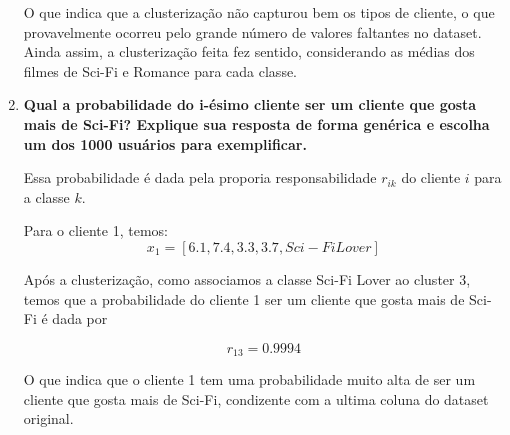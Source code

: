 \begin{enumerate}
\begin{tcolorbox}[title=Resposta:]
        O que indica que a clusterização não capturou bem os tipos de cliente, o que provavelmente ocorreu pelo grande número de valores faltantes no dataset. Ainda assim, a clusterização feita fez sentido, considerando as médias dos filmes de Sci-Fi e Romance para cada classe.

    \end{tcolorbox}
    \newpage
    \item \textbf{Qual a probabilidade do i-ésimo cliente ser um cliente que gosta mais de Sci-Fi? Explique sua resposta de forma genérica e escolha um dos 1000 usuários para exemplificar.}
    \begin{tcolorbox}[title=Resposta:]
        Essa probabilidade é dada pela proporia responsabilidade $r_{ik}$ do cliente $i$ para a classe $k$.

        Para o cliente 1, temos:
        $$ x_1 = [6.1, 7.4, 3.3, 3.7, Sci-Fi Lover] $$

        Após a clusterização, como associamos a classe Sci-Fi Lover ao cluster 3, temos que a probabilidade do cliente 1 ser um cliente que gosta mais de Sci-Fi é dada por

        $$ r_{13} = 0.9994$$

        O que indica que o cliente 1 tem uma probabilidade muito alta de ser um cliente que gosta mais de Sci-Fi, condizente com a ultima coluna do dataset original.
    \end{tcolorbox}
\end{enumerate}


